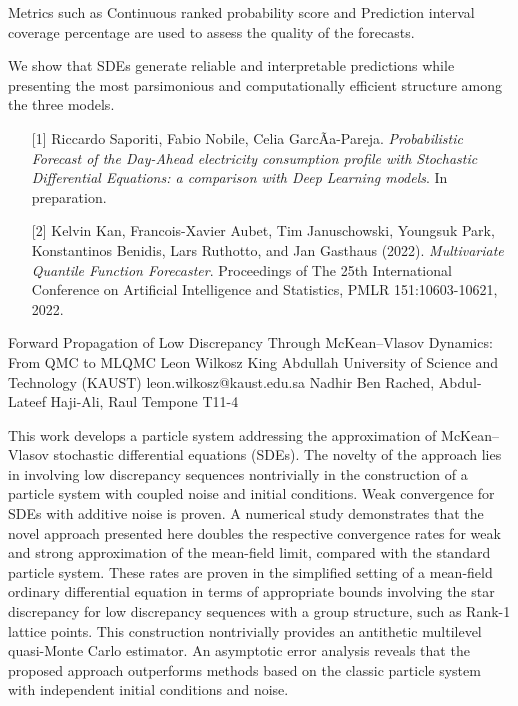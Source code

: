 \begin{talk}
Metrics such as Continuous ranked probability score and Prediction interval coverage percentage are used to assess the quality of the forecasts. 

We show that SDEs generate reliable and interpretable predictions while presenting the most parsimonious and computationally efficient structure among the three models.


\medskip

 

\begin{enumerate}
    \item[{[1]}] Riccardo Saporiti, Fabio Nobile, Celia GarcÃ­a-Pareja. {\it Probabilistic Forecast of the Day-Ahead electricity consumption profile with Stochastic Differential Equations: a comparison with Deep Learning models}. In preparation.

	\item[{[2]}] Kelvin Kan, Francois-Xavier Aubet, Tim Januschowski, Youngsuk Park, Konstantinos Benidis, Lars Ruthotto, and Jan Gasthaus (2022). {\it Multivariate Quantile Function Forecaster}. Proceedings of The 25th International Conference on Artificial Intelligence and Statistics, PMLR 151:10603-10621, 2022.
 
\end{enumerate}
 
\end{talk}

\begin{talk}
  {Forward Propagation of Low Discrepancy Through McKean--Vlasov Dynamics: From QMC to MLQMC}%
  {Leon Wilkosz}%
  {King Abdullah University of Science and Technology (KAUST)}%
  {leon.wilkosz@kaust.edu.sa}%
  {Nadhir Ben Rached, Abdul-Lateef Haji-Ali, Raul Tempone}%
  {T11-4}%
			
This work develops a particle system addressing the approximation of \linebreak McKean--Vlasov stochastic differential equations (SDEs). The novelty of the approach lies in involving low discrepancy sequences nontrivially in the construction of a particle system with coupled noise and initial conditions. Weak convergence for SDEs with additive noise is proven. A numerical study demonstrates that the novel approach presented here doubles the respective convergence rates for weak and strong approximation of the mean-field limit, compared with the standard particle system. These rates are proven in the simplified setting of a mean-field ordinary differential equation in terms of appropriate bounds involving the star discrepancy for low discrepancy sequences with a group structure, such as Rank-1 lattice points. This construction nontrivially provides an antithetic multilevel quasi-Monte Carlo estimator. An asymptotic error analysis reveals that the proposed approach outperforms methods based on the classic particle system with independent initial conditions and noise.
\end{talk}

